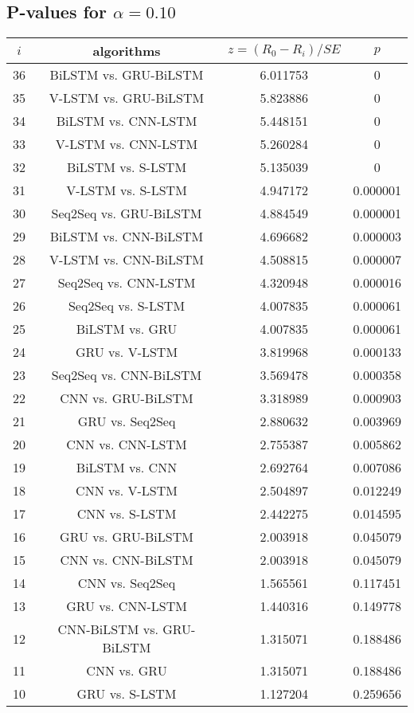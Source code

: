 \documentclass[a4paper,10pt]{article}
\begin{document}
\begin{landscape}
\subsection{P-values for $\alpha=0.10$}

\begin{table}[!htp]
\centering\scriptsize
\begin{tabular}{cccc}
$i$&algorithms&$z=(R_0 - R_i)/SE$&$p$\\
\hline36&BiLSTM vs. GRU-BiLSTM&6.011753&0\\
35&V-LSTM vs. GRU-BiLSTM&5.823886&0\\
34&BiLSTM vs. CNN-LSTM&5.448151&0\\
33&V-LSTM vs. CNN-LSTM&5.260284&0\\
32&BiLSTM vs. S-LSTM&5.135039&0\\
31&V-LSTM vs. S-LSTM&4.947172&0.000001\\
30&Seq2Seq vs. GRU-BiLSTM&4.884549&0.000001\\
29&BiLSTM vs. CNN-BiLSTM&4.696682&0.000003\\
28&V-LSTM vs. CNN-BiLSTM&4.508815&0.000007\\
27&Seq2Seq vs. CNN-LSTM&4.320948&0.000016\\
26&Seq2Seq vs. S-LSTM&4.007835&0.000061\\
25&BiLSTM vs. GRU&4.007835&0.000061\\
24&GRU vs. V-LSTM&3.819968&0.000133\\
23&Seq2Seq vs. CNN-BiLSTM&3.569478&0.000358\\
22&CNN vs. GRU-BiLSTM&3.318989&0.000903\\
21&GRU vs. Seq2Seq&2.880632&0.003969\\
20&CNN vs. CNN-LSTM&2.755387&0.005862\\
19&BiLSTM vs. CNN&2.692764&0.007086\\
18&CNN vs. V-LSTM&2.504897&0.012249\\
17&CNN vs. S-LSTM&2.442275&0.014595\\
16&GRU vs. GRU-BiLSTM&2.003918&0.045079\\
15&CNN vs. CNN-BiLSTM&2.003918&0.045079\\
14&CNN vs. Seq2Seq&1.565561&0.117451\\
13&GRU vs. CNN-LSTM&1.440316&0.149778\\
12&CNN-BiLSTM vs. GRU-BiLSTM&1.315071&0.188486\\
11&CNN vs. GRU&1.315071&0.188486\\
10&GRU vs. S-LSTM&1.127204&0.259656\\

\end{tabular}
\end{table}
\end{landscape}
\end{document}

